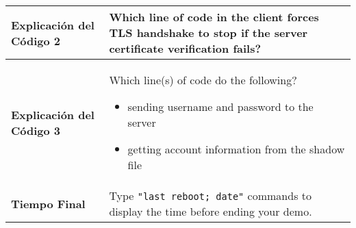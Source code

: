 \begin{longtable}{|p{}|p{}|}
 \textbf{Explicación del Código 2} & 
	Which line of code in the client forces TLS handshake to stop if the server certificate
	verification fails?
 \\ 
 \hline

 \textbf{Explicación del Código 3} & 
	Which line(s) of code do the following?
	\vspace*{0.2cm}
 	\begin{itemize}[topsep=-0.5cm,leftmargin=0.4cm]
		\item sending username and password to the server
		\item getting account information from the shadow file
	\end{itemize}
 \\ 
 \hline

 \textbf{Tiempo Final} & 
	Type \texttt{"last reboot; date"} commands to display the time before ending your demo.
 \\ 
 \hline

\end{longtable}
